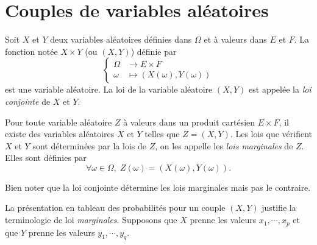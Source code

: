 \section{Couples de variables aléatoires}
\begin{defi}
Soit $X$ et $Y$ deux variables aléatoires définies dans $\Omega$ et à valeurs dans $E$ et $F$. La fonction notée $X\times Y$ (ou $(X,Y)$) définie par
\begin{displaymath}
\left\lbrace 
\begin{aligned}
\Omega &\rightarrow E \times F \\ \omega &\mapsto (X(\omega),Y(\omega)) 
\end{aligned}
\right. 
\end{displaymath}
est une variable aléatoire. 
 
La loi de la variable aléatoire $(X,Y)$ est appelée la \emph{loi conjointe} de $X$ et $Y$. 
\end{defi}
\begin{defi}
Pour toute variable aléatoire $Z$ à valeurs dans un produit cartésien $E\times F$, il existe des variables aléatoires $X$ et $Y$ telles que $Z=(X,Y)$. Les lois que vérifient $X$ et $Y$ sont déterminées par la lois de $Z$, on les appelle les \emph{lois marginales} de $Z$. Elles sont définies par 
\[
 \forall \omega \in \Omega, \; Z(\omega) = \left( X(\omega), Y(\omega)\right). 
\]  
\end{defi}
\begin{rem}
  Bien noter que la loi conjointe détermine les lois marginales mais pas le contraire.
\end{rem}
La présentation en tableau des probabilités pour un couple $(X,Y)$ justifie la terminologie de loi \emph{marginales}.\newline
Supposons que $X$ prenne les valeurs $x_1, \cdots, x_p$ et que $Y$ prenne les valeurs $y_1,\cdots, y_q$.
